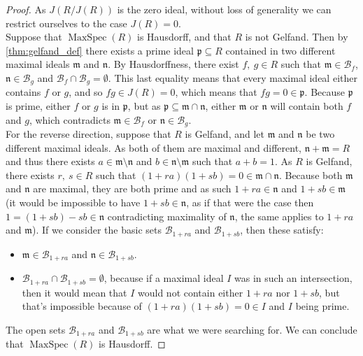 \documentclass[a4paper]{book}
\theoremstyle{definition}
\theoremstyle{ejemplo}
\theoremstyle{demostracion}
\DeclareMathOperator{\maxspec}{MaxSpec}
\begin{document}
\begin{proof}
	As $J(R/J(R))$ is the zero ideal, without loss of generality we can restrict ourselves to the case $J(R) = 0$.\\ 
	Suppose that $\maxspec(R)$ is Hausdorff, and that $R$ is not Gelfand. Then by \eqref{thm:gelfand_def} there exists a prime ideal $\mathfrak{p} \subseteq R$ contained in two different maximal ideals $\mathfrak{m}$ and $\mathfrak{n}$. By Hausdorffness, there exist $f,\ g \in R$ such that $\mathfrak{m} \in \mathcal{B}_f$, $\mathfrak{n} \in \mathcal{B}_g$ and $\mathcal{B}_f \cap \mathcal{B}_g = \emptyset$. This last equality means that every maximal ideal either contains $f$ or $g$, and so $fg \in J(R) = 0$, which means that $fg = 0 \in \mathfrak{p}$. Because $\mathfrak{p}$ is prime, either $f$ or $g$ is in $\mathfrak{p}$, but as $\mathfrak{p} \subseteq \mathfrak{m} \cap \mathfrak{n}$, either $\mathfrak{m}$ or $\mathfrak{n}$ will contain both $f$ and $g$, which contradicts $\mathfrak{m} \in \mathcal{B}_f$ or $\mathfrak{n} \in \mathcal{B}_g$.\\ 
	For the reverse direction, suppose that $R$ is Gelfand, and let $\mathfrak{m}$ and $\mathfrak{n}$ be two different maximal ideals. As both of them are maximal and different, $\mathfrak{n} + \mathfrak{m} = R$ and thus there exists $a \in \mathfrak{m} \setminus \mathfrak{n}$ and $b \in \mathfrak{n} \setminus \mathfrak{m}$ such that $a + b = 1$. As $R$ is Gelfand, there exists $r,\ s \in R$ such that $(1 + ra)(1 + sb) = 0 \in \mathfrak{m} \cap \mathfrak{n}$. Because both $\mathfrak{m}$ and $\mathfrak{n}$ are maximal, they are both prime and as such $1 + ra \in \mathfrak{n}$ and $1 + sb \in \mathfrak{m}$ (it would be impossible to have $1 + sb \in \mathfrak{n}$, as if that were the case then $1 = (1 + sb) - sb \in \mathfrak{n}$ contradicting maximality of $\mathfrak{n}$, the same applies to $1 + ra$ and $\mathfrak{m}$). If we consider the basic sets $\mathcal{B}_{1 + ra}$ and $\mathcal{B}_{1 + sb}$, then these satisfy:
	\begin{itemize}
		\item
		$\mathfrak{m} \in \mathcal{B}_{1 + ra}$ and $\mathfrak{n} \in \mathcal{B}_{1 + sb}$.
		\item
		$\mathcal{B}_{1 + ra} \cap \mathcal{B}_{1 + sb} = \emptyset$, because if a maximal ideal $I$ was in such an intersection, then it would mean that $I$ would not contain either $1 + ra$ nor $1 + sb$, but that's impossible because of $(1 + ra)(1 + sb) = 0 \in I$ and $I$ being prime.
	\end{itemize}
	The open sets $\mathcal{B}_{1 + ra}$ and $\mathcal{B}_{1 + sb}$ are what we were searching for. We can conclude that $\maxspec(R)$ is Hausdorff.
\end{proof}
\end{document}

